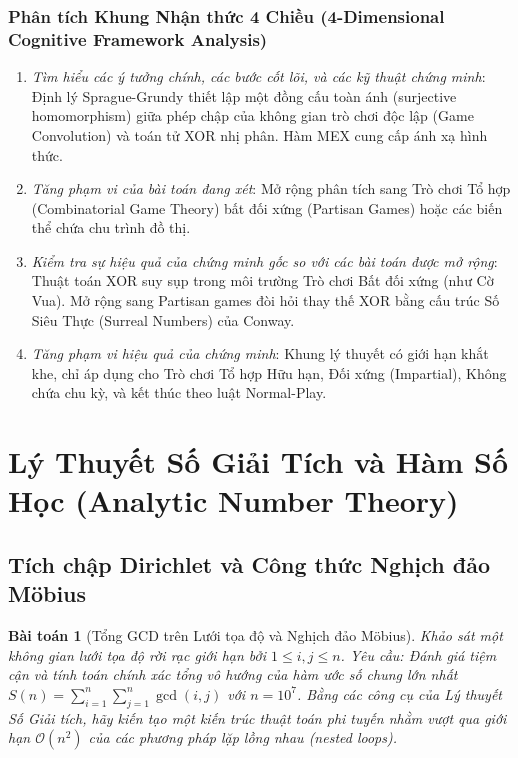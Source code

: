 \documentclass{article}
\newtheorem{baitoan}{Bài toán}
\begin{document}
\subsubsection*{Phân tích Khung Nhận thức 4 Chiều (4-Dimensional Cognitive Framework Analysis)}
\begin{enumerate}
 \item \textit{Tìm hiểu các ý tưởng chính, các bước cốt lõi, và các kỹ thuật chứng minh}: Định lý Sprague-Grundy thiết lập một đồng cấu toàn ánh (surjective homomorphism) giữa phép chập của không gian trò chơi độc lập (Game Convolution) và toán tử XOR nhị phân. Hàm MEX cung cấp ánh xạ hình thức.
 \item \textit{Tăng phạm vi của bài toán đang xét}: Mở rộng phân tích sang Trò chơi Tổ hợp (Combinatorial Game Theory) bất đối xứng (Partisan Games) hoặc các biến thể chứa chu trình đồ thị.
 \item \textit{Kiểm tra sự hiệu quả của chứng minh gốc so với các bài toán được mở rộng}: Thuật toán XOR suy sụp trong môi trường Trò chơi Bất đối xứng (như Cờ Vua). Mở rộng sang Partisan games đòi hỏi thay thế XOR bằng cấu trúc Số Siêu Thực (Surreal Numbers) của Conway.
 \item \textit{Tăng phạm vi hiệu quả của chứng minh}: Khung lý thuyết có giới hạn khắt khe, chỉ áp dụng cho Trò chơi Tổ hợp Hữu hạn, Đối xứng (Impartial), Không chứa chu kỳ, và kết thúc theo luật Normal-Play.
\end{enumerate}



\section{Lý Thuyết Số Giải Tích và Hàm Số Học (Analytic Number Theory)}
\subsection{Tích chập Dirichlet và Công thức Nghịch đảo Möbius}

\begin{baitoan}[Tổng GCD trên Lưới tọa độ và Nghịch đảo Möbius]
Khảo sát một không gian lưới tọa độ rời rạc giới hạn bởi $1 \le i, j \le n$. Yêu cầu: Đánh giá tiệm cận và tính toán chính xác tổng vô hướng của hàm ước số chung lớn nhất $S(n) = \sum_{i=1}^n \sum_{j=1}^n \gcd(i, j)$ với $n = 10^7$. Bằng các công cụ của Lý thuyết Số Giải tích, hãy kiến tạo một kiến trúc thuật toán phi tuyến nhằm vượt qua giới hạn $\mathcal{O}(n^2)$ của các phương pháp lặp lồng nhau (nested loops).
\end{baitoan}
\end{document}
